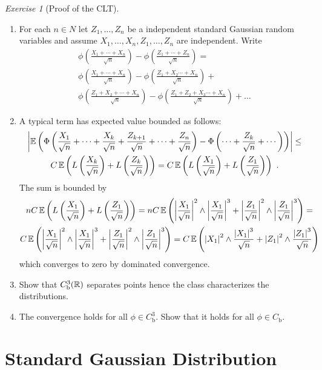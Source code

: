 \documentclass[12pt,a4paper]{amsart}
\theoremstyle{plain}%
\theoremstyle{definition}
\theoremstyle{remark}
\newtheorem{exercise}{Exercise}
\begin{document}
\begin{exercise}[Proof of the CLT]
\begin{enumerate}
\item For each $n \in N$ let $Z_1,\dots,Z_n$ be a independent standard Gaussian random variables and assume $X_1,\dots,X_n,Z_1,\dots,Z_n$ are independent. Write
    \begin{multline*}
      \phi\left(\frac{X_1+\cdots+X_n}{\sqrt n}\right) - \phi\left(\frac{Z_1+\cdots+Z_n}{\sqrt n}\right) = \\
      \phi\left(\frac{X_1+\cdots+X_n}{\sqrt n}\right) - \phi\left(\frac{Z_1+X_2\cdots+X_n}{\sqrt n}\right) + \\
      \phi\left(\frac{Z_1+X_2+\cdots+X_n}{\sqrt n}\right) - \phi\left(\frac{Z_1+Z_2+X_3\cdots+X_n}{\sqrt n}\right) + \dots
    \end{multline*}
\item A typical term has expected value bounded as follows:
  \begin{multline*}
\left\vert\operatorname{\mathbb E}\left(\Phi\left(\frac{X_1}{\sqrt n}+ \cdots + \frac{X_k}{\sqrt n} + \frac{Z_{k+1}}{\sqrt n}+ \cdots +\frac{Z_n}{\sqrt n}\right) - \Phi\left(\cdots + \frac{Z_k}{\sqrt n} + \cdots\right)\right)\right\vert \leq \\ C \operatorname{\mathbb E}\left(L\left(\frac{X_k}{\sqrt n}\right) + L\left(\frac{Z_k}{\sqrt n}\right)\right) = C \operatorname{\mathbb E}\left(L\left(\frac{X_1}{\sqrt n}\right) + L\left(\frac{Z_1}{\sqrt n}\right)\right) \ .    
  \end{multline*}
The sum is bounded by
\begin{multline*}
nC \operatorname{\mathbb E}\left(L\left(\frac{X_1}{\sqrt n}\right) + L\left(\frac{Z_1}{\sqrt n}\right)\right) = nC \operatorname{\mathbb E}\left(\left\vert\frac{X_1}{\sqrt n}\right\vert^2\wedge \left\vert\frac{X_1}{\sqrt n}\right\vert^3 + \left\vert\frac{Z_1}{\sqrt n}\right\vert^2\wedge \left\vert\frac{Z_1}{\sqrt n}\right\vert^3\right) = \\
C \operatorname{\mathbb E}\left(\left\vert\frac{X_1}{\sqrt n}\right\vert^2\wedge \left\vert\frac{X_1}{\sqrt n}\right\vert^3 + \left\vert\frac{Z_1}{\sqrt n}\right\vert^2\wedge \left\vert\frac{Z_1}{\sqrt n}\right\vert^3\right) =
C \operatorname{\mathbb E}\left(\left\vert X_1\right\vert^2 \wedge \frac{\left\vert X_1\right\vert^3}{\sqrt n} + \left\vert Z_1\right\vert^2 \wedge \frac{\left\vert Z_1\right\vert^3}{\sqrt n}\right)\end{multline*}
which converges to zero by dominated convergence.
\item Show that $C^3_{\text b}(\mathbb{R})$ separates points hence the class
  characterizes the distributions.
  \item The convergence holds for all $\phi \in C^3_{\text{b}}$. Show that it holds for all $\phi \in C_{\text{b}}$.
  \end{enumerate}  
\end{exercise}

\section{Standard Gaussian Distribution}
\label{sec:recap}
   
\end{document}
